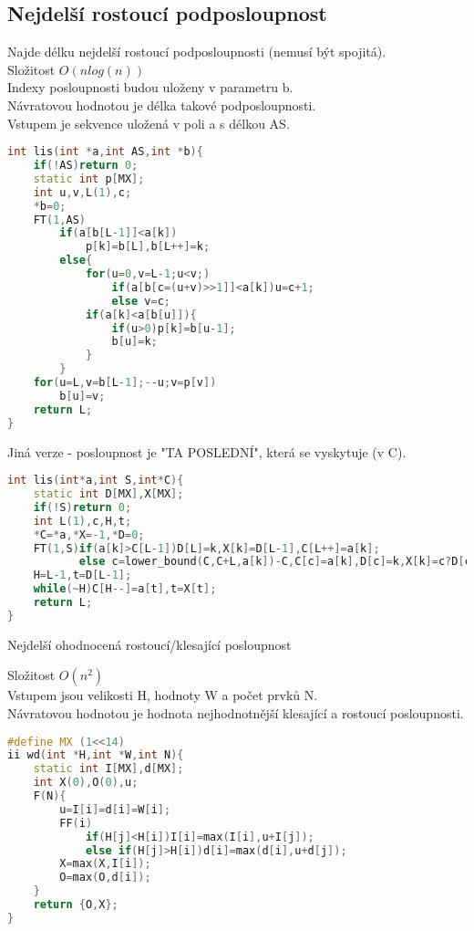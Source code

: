 \documentclass[11pt]{article}
\begin{document}
\subsection{Nejdelší rostoucí podposloupnost}
Najde délku nejdelší rostoucí podposloupnosti (nemusí být spojitá).
\\Složitost $O(nlog(n))$
\\Indexy posloupnosti budou uloženy v parametru \textsf{b}.
\\Návratovou hodnotou je délka takové podposloupnosti.
\\Vstupem je sekvence uložená v poli \textsf{a} s délkou \textsf{AS}.
\begin{lstlisting}[language=C++]
int lis(int *a,int AS,int *b){
    if(!AS)return 0;
    static int p[MX];
    int u,v,L(1),c;
    *b=0;
    FT(1,AS)
        if(a[b[L-1]]<a[k])
            p[k]=b[L],b[L++]=k;
        else{
            for(u=0,v=L-1;u<v;)
                if(a[b[c=(u+v)>>1]]<a[k])u=c+1;
                else v=c;
            if(a[k]<a[b[u]]){
                if(u>0)p[k]=b[u-1];
                b[u]=k;
            }
        }
    for(u=L,v=b[L-1];--u;v=p[v]) 
        b[u]=v;
    return L;
}
\end{lstlisting}
Jiná verze - posloupnost je "TA POSLEDNÍ", která se vyskytuje (v \textsf{C}).
\begin{lstlisting}[language=C++]
int lis(int*a,int S,int*C){
    static int D[MX],X[MX];
    if(!S)return 0;
    int L(1),c,H,t;
    *C=*a,*X=-1,*D=0;
    FT(1,S)if(a[k]>C[L-1])D[L]=k,X[k]=D[L-1],C[L++]=a[k];
           else c=lower_bound(C,C+L,a[k])-C,C[c]=a[k],D[c]=k,X[k]=c?D[c-1]:-1;
    H=L-1,t=D[L-1];
    while(~H)C[H--]=a[t],t=X[t];
    return L;
}
\end{lstlisting}
\begin{center}
Nejdelší ohodnocená rostoucí/klesající posloupnost
\end{center}
Složitost $O(n^2)$
\\Vstupem jsou velikosti \textsf{H}, hodnoty \textsf{W} a počet prvků \textsf{N}.
\\Návratovou hodnotou je hodnota nejhodnotnější klesající a rostoucí posloupnosti.
\begin{lstlisting}[language=C++]
#define MX (1<<14)
ii wd(int *H,int *W,int N){
    static int I[MX],d[MX];
    int X(0),O(0),u;
    F(N){
        u=I[i]=d[i]=W[i];
        FF(i)
            if(H[j]<H[i])I[i]=max(I[i],u+I[j]);
            else if(H[j]>H[i])d[i]=max(d[i],u+d[j]);
        X=max(X,I[i]);
        O=max(O,d[i]);
    }
    return {O,X};
}
\end{lstlisting}
\end{document}
